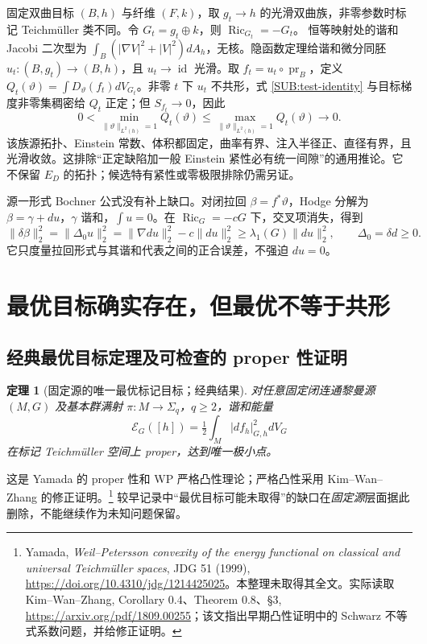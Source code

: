\documentclass[UTF8,fontset=fandol,zihao=-4,oneside,openany]{ctexbook}
\theoremstyle{cjkplain}
\newtheorem{theorem}{定理}[chapter]
\numberwithin{equation}{chapter}
\begin{document}
固定双曲目标 $(B,h)$ 与纤维 $(F,k)$，取 $g_t\to h$ 的光滑双曲族，非零参数时标记 Teichmüller 类不同。令
$G_t=g_t\oplus k$，则 $\operatorname{Ric}_{G_t}=-G_t$。
恒等映射处的谐和 Jacobi 二次型为
$\int_B(|\nabla V|^2+|V|^2)dA_h$，无核。隐函数定理给谐和微分同胚
$u_t:(B,g_t)\to(B,h)$，且 $u_t\to\operatorname{id}$ 光滑。取
$f_t=u_t\circ\operatorname{pr}_B$，定义
$Q_t(\vartheta)=\int D_\vartheta(f_t)dV_{G_t}$。非零 $t$ 下 $u_t$ 不共形，式 \eqref{SUB:test-identity} 与目标梯度非零集稠密给 $Q_t$ 正定；但 $S_{f_t}\to0$，因此
\begin{equation}\label{SUB:no-uniform-test-gap}
0<\min_{\|\vartheta\|_{L^2(h)}=1}Q_t(\vartheta)
\le\max_{\|\vartheta\|_{L^2(h)}=1}Q_t(\vartheta)\longrightarrow0.
\end{equation}
该族源拓扑、Einstein 常数、体积都固定，曲率有界、注入半径正、直径有界，且光滑收敛。这排除“正定缺陷加一般 Einstein 紧性必有统一间隙”的通用推论。它不保留 $E_D$ 的拓扑；候选特有紧性或零极限排除仍需另证。

源一形式 Bochner 公式没有补上缺口。对闭拉回 $\beta=f^*\vartheta$，Hodge 分解为 $\beta=\gamma+du$，$\gamma$ 谐和，$\int u=0$。在 $\operatorname{Ric}_G=-cG$ 下，交叉项消失，得到
\begin{equation}\label{SUB:one-form-bochner-split}
\|\delta\beta\|_2^2=\|\Delta_0u\|_2^2
=\|\nabla du\|_2^2-c\|du\|_2^2
\ge\lambda_1(G)\|du\|_2^2,\qquad\Delta_0=\delta d\ge0.
\end{equation}
它只度量拉回形式与其谐和代表之间的正合误差，不强迫 $du=0$。

\section{最优目标确实存在，但最优不等于共形}

\subsection{经典最优目标定理及可检查的 proper 性证明}

\begin{theorem}[固定源的唯一最优标记目标；经典结果]\label{SUB:optimal-target}
对任意固定闭连通黎曼源 $(M,G)$ 及基本群满射
$\pi:M\to\Sigma_q$，$q\ge2$，谐和能量
\[
\mathcal E_G([h])=\tfrac12\int_M|df_h|_{G,h}^2dV_G
\]
在标记 Teichmüller 空间上 proper，达到唯一极小点。
\end{theorem}

这是 Yamada 的 proper 性和 WP 严格凸性理论；严格凸性采用 Kim--Wan--Zhang 的修正证明。\footnote{Yamada, \emph{Weil--Petersson convexity of the energy functional on classical and universal Teichmüller spaces}, JDG 51 (1999), \url{https://doi.org/10.4310/jdg/1214425025}。本整理未取得其全文。实际读取 Kim--Wan--Zhang, Corollary 0.4、Theorem 0.8、§3, \url{https://arxiv.org/pdf/1809.00255}；该文指出早期凸性证明中的 Schwarz 不等式系数问题，并给修正证明。}
较早记录中“最优目标可能未取得”的缺口在\emph{固定源}层面据此删除，不能继续作为未知问题保留。
\end{document}
